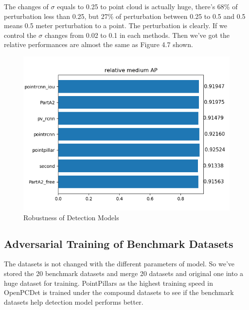 The changes of \(\sigma\) equals to 0.25 to point cloud is actually huge, there's 68\% of perturbation less than 0.25, but 27\% of perturbation between 0.25 to 0.5 and 0.5 means 0.5 meter perturbation to a point. The perturbation is clearly. If we control the \(\sigma\) changes from 0.02 to 0.1 in each methods. Then we've got the relative performances are almost the same as Figure 4.7 shown.
\begin{figure}[!htbp]
\centering
\includegraphics[scale=0.4]{Graphics/Relative AP1.png}
\caption{Robustness of Detection Models}
\label{fig:Relative AP1}
\end{figure}

\subsection{Adversarial Training of Benchmark Datasets}
The datasets is not changed with the different parameters of model. So we've stored the 20 benchmark datasets and merge 20 datasets and original one into a huge dataset for training. PointPillars as the highest training speed in OpenPCDet is trained under the compound datasets to see if the benchmark datasets help detection model performs better. 

